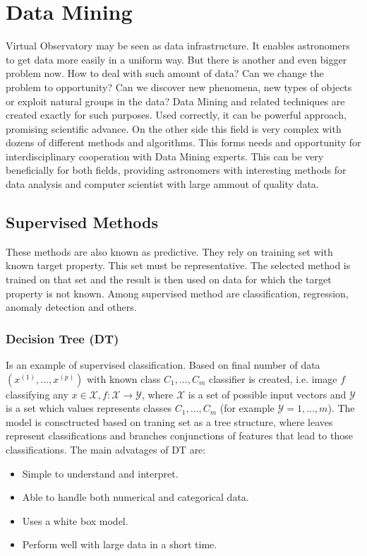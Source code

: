 \chapter{Data Mining}
Virtual Observatory may be seen as data infrastructure. It enables
astronomers to get data more easily in a uniform way. But there is
another and even bigger problem now. How to deal with such amount of
data? Can we change the problem to opportunity? Can we discover new
phenomena, new types of objects or exploit natural groups in the data?
Data Mining and related techniques are created exactly for such
purposes. Used correctly, it can be powerful approach, promising
scientific advance. On the other side this field is very complex with
dozens of different methods and algorithms. This forms needs and
opportunity for interdisciplinary cooperation with Data Mining
experts. This can be very beneficially for both fields, providing
astronomers with interesting methods for data analysis and computer
scientist with large ammout of quality data.

\section{Supervised Methods}
These methods are also known as predictive\cite{ball2010data}. They
rely on training set with known target property. This set must be
representative. The selected method is trained on that set and the
result is then used on data for which the target property is not
known. Among supervised method are classification, regression, anomaly
detection and others.

\subsection{Decision Tree (DT)}
Is an example of supervised classification. Based on final number of
data $(x^{(1)},\ldots,x^{(p)})$ with known class $C_1,\ldots, C_m$
classifier is created, i.e. image $f$ classifying any $x \in
\mathcal{X}, f:\mathcal{X}\rightarrow \mathcal{Y}$, where
$\mathcal{X}$ is a set of possible input vectors and $\mathcal{Y}$ is
a set which values represents classes $C_1,\ldots, C_m$ (for example
$\mathcal{Y} = {1,\ldots,m}$). The model is consctructed based on
traning set as a tree structure, where leaves represent
classifications and branches conjunctions of features that lead to
those classifications. The main advatages of DT are:

\begin{itemize}
\item Simple to understand and interpret.
\item Able to handle both numerical and categorical data.
\item Uses a white box model.
\item Perform well with large data in a short time.
\end{itemize}

